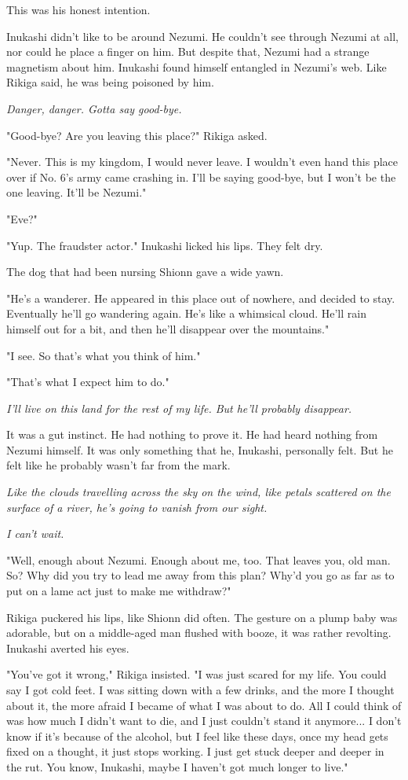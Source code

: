 This was his honest intention.

Inukashi didn't like to be around Nezumi. He couldn't see through Nezumi
at all, nor could he place a finger on him. But despite that, Nezumi had
a strange magnetism about him. Inukashi found himself entangled in
Nezumi's web. Like Rikiga said, he was being poisoned by him.

\emph{Danger, danger. Gotta say good-bye.}

"Good-bye? Are you leaving this place?" Rikiga asked.

"Never. This is my kingdom, I would never leave. I wouldn't even hand
this place over if No. 6's army came crashing in. I'll be saying
good-bye, but I won't be the one leaving. It'll be Nezumi."

"Eve?"

"Yup. The fraudster actor." Inukashi licked his lips. They felt dry.~

The dog that had been nursing Shionn gave a wide yawn.

"He's a wanderer. He appeared in this place out of nowhere, and decided
to stay. Eventually he'll go wandering again. He's like a whimsical
cloud. He'll rain himself out for a bit, and then he'll disappear over
the mountains."

"I see. So that's what you think of him."

"That's what I expect him to do."

\emph{I'll live on this land for the rest of my life. But he'll probably
	disappear.}

It was a gut instinct. He had nothing to prove it. He had heard nothing
from Nezumi himself. It was only something that he, Inukashi, personally
felt. But he felt like he probably wasn't far from the mark.

\emph{Like the clouds travelling across the sky on the wind, like petals
	scattered on the surface of a river, he's going to vanish from our
	sight.}

\emph{I can't wait.}

"Well, enough about Nezumi. Enough about me, too. That leaves you, old
man. So? Why did you try to lead me away from this plan? Why'd you go as
far as to put on a lame act just to make me withdraw?"

Rikiga puckered his lips, like Shionn did often. The gesture on a plump
baby was adorable, but on a middle-aged man flushed with booze, it was
rather revolting. Inukashi averted his eyes.

"You've got it wrong," Rikiga insisted. "I was just scared for my life.
You could say I got cold feet. I was sitting down with a few drinks, and
the more I thought about it, the more afraid I became of what I was
about to do. All I could think of was how much I didn't want to die, and
I just couldn't stand it anymore... I don't know if it's because of the
alcohol, but I feel like these days, once my head gets fixed on a
thought, it just stops working. I just get stuck deeper and deeper in
the rut. You know, Inukashi, maybe I haven't got much longer to live."

